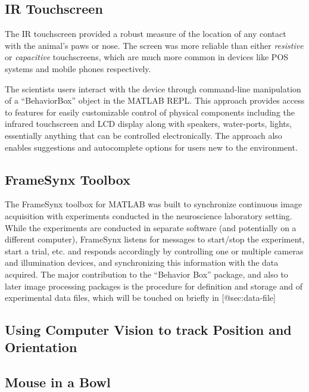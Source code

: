 \subsection{
	IR Touchscreen}\label{sec:ir-touchscreen} 

The IR touchscreen provided a robust measure of the location of any contact with the animal's paws or nose.
The screen was more reliable than either \emph{resistive} or \emph{capacitive} touchscreens, which are much more common in devices like POS systems and mobile phones respectively.

The scientists users interact with the device through command-line manipulation of a ``BehaviorBox'' object in the MATLAB REPL.
This approach provides access to features for easily customizable control of physical components including the infrared touchscreen and LCD display along with speakers, water-ports, lights, essentially anything that can be controlled electronically.
The approach also enables suggestions and autocomplete options for users new to the environment.

\subsection{
	FrameSynx Toolbox}\label{sec:framesynx-toolbox} 

The FrameSynx toolbox for MATLAB was built to synchronize continuous image acquisition with experiments conducted in the neuroscience laboratory setting.
While the experiments are conducted in separate software (and potentially on a different computer), FrameSynx listens for messages to start/stop the experiment, start a trial, etc. and responds accordingly by controlling one or multiple cameras and illumination devices, and synchronizing this information with the data acquired.
The major contribution to the ``Behavior Box'' package, and also to later image processing packages is the procedure for definition and storage and of experimental data files, which will be touched on briefly in {[}@sec:data-file{]} 

\subsection{Using Computer Vision to track Position and Orientation}\label{sec:using-computer-vision-to-track-position-and-orientation} 

\subsection{Mouse in a Bowl}\label{mouse-in-a-bowl} 

